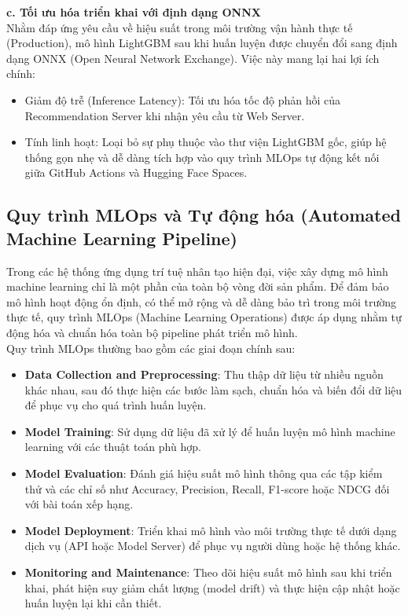 \indent \textbf{c. Tối ưu hóa triển khai với định dạng ONNX}\\
\indent Nhằm đáp ứng yêu cầu về hiệu suất trong môi trường vận hành thực tế (Production), mô hình LightGBM sau khi huấn luyện được chuyển đổi sang định dạng ONNX (Open Neural Network Exchange). Việc này mang lại hai lợi ích chính:
\begin{itemize}
    \item[1.] Giảm độ trễ (Inference Latency): Tối ưu hóa tốc độ phản hồi của Recommendation Server khi nhận yêu cầu từ Web Server.
    \item[2.] Tính linh hoạt: Loại bỏ sự phụ thuộc vào thư viện LightGBM gốc, giúp hệ thống gọn nhẹ và dễ dàng tích hợp vào quy trình MLOps tự động kết nối giữa GitHub Actions và Hugging Face Spaces.
\end{itemize}

\subsection{Quy trình MLOps và Tự động hóa (Automated Machine Learning Pipeline)}

\indent \indent Trong các hệ thống ứng dụng trí tuệ nhân tạo hiện đại, việc xây dựng mô hình machine learning chỉ là một phần của toàn bộ vòng đời sản phẩm. Để đảm bảo mô hình hoạt động ổn định, có thể mở rộng và dễ dàng bảo trì trong môi trường thực tế, quy trình MLOps (Machine Learning Operations) được áp dụng nhằm tự động hóa và chuẩn hóa toàn bộ pipeline phát triển mô hình.\\
\indent Quy trình MLOps thường bao gồm các giai đoạn chính sau:

\begin{itemize}
    \item[1.] \textbf{Data Collection and Preprocessing}: Thu thập dữ liệu từ nhiều nguồn khác nhau, sau đó thực hiện các bước làm sạch, chuẩn hóa và biến đổi dữ liệu để phục vụ cho quá trình huấn luyện.
    \item[2.] \textbf{Model Training}: Sử dụng dữ liệu đã xử lý để huấn luyện mô hình machine learning với các thuật toán phù hợp.
    \item[3.] \textbf{Model Evaluation}: Đánh giá hiệu suất mô hình thông qua các tập kiểm thử và các chỉ số như Accuracy, Precision, Recall, F1-score hoặc NDCG đối với bài toán xếp hạng.
    \item[4.] \textbf{Model Deployment}: Triển khai mô hình vào môi trường thực tế dưới dạng dịch vụ (API hoặc Model Server) để phục vụ người dùng hoặc hệ thống khác.
    \item[5.] \textbf{Monitoring and Maintenance}: Theo dõi hiệu suất mô hình sau khi triển khai, phát hiện suy giảm chất lượng (model drift) và thực hiện cập nhật hoặc huấn luyện lại khi cần thiết.
\end{itemize}

